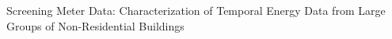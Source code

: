 Screening Meter Data: Characterization of Temporal Energy Data from Large Groups of Non-Residential Buildings